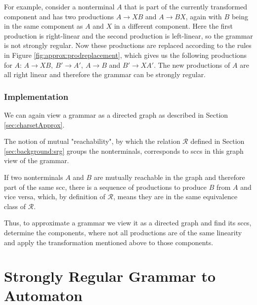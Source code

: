For example, consider a nonterminal $A$ that is part of the currently transformed component and has two productions $A \rightarrow X B$ and $A \rightarrow B X$, again with $B$ being in the same component as $A$ and $X$ in a different component. Here the first production is right-linear and the second production is left-linear, so the grammar is not strongly regular.
Now these productions are replaced according to the rules in Figure \ref{fig:approx:prodreplacement}, which gives us the following productions for $A$: $A \rightarrow XB,\ B' \rightarrow A',\ A \rightarrow B$ and $B' \rightarrow X A'$.
The new productions of $A$ are all right linear and therefore the grammar can be strongly regular.

\subsubsection{Implementation}

We can again view a grammar as a directed graph as described in Section \ref{sec:charsetApprox}.

The notion of mutual "reachability", by which the relation $\mathcal{R}$ defined in Section \ref{sec:background:srg} groups the nonterminals, corresponds to \acp{scc} in this graph view of the grammar.

If two nonterminals $A$ and $B$ are mutually reachable in the graph and therefore part of the same \ac{scc}, there is a sequence of productions to produce $B$ from $A$ and vice versa, which, by definition of $\mathcal{R}$, means they are in the same equivalence class of $\mathcal{R}$.

Thus, to approximate a grammar we view it as a directed graph and find its \acp{scc}, determine the components, where not all productions are of the same linearity and apply the transformation mentioned above to those components.

\begin{comment}

	
	Since a \ac{srg} generates a regular language and both steps in the transformation to a regular expression create an equivalent output from their input, the resulting regular expression accepts the language generated by the original \ac{srg}.
\end{comment}


\section{Strongly Regular Grammar to Automaton}\label{sec:nederhofAlgorithm}

